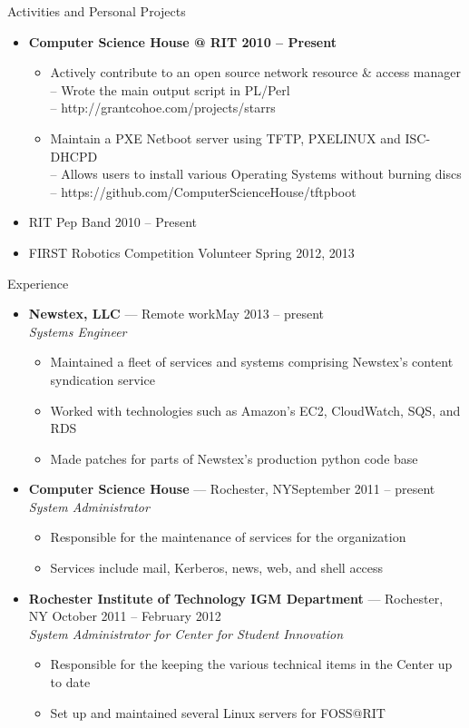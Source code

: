 \documentclass[10pt,oneside]{article}
\newenvironment{ressection}[1]{
	\vspace{3pt}
	{\fontfamily{ppl}\selectfont\Large#1}
	\begin{itemize}
	\vspace{2pt}
}{
	\end{itemize}
}
\newcommand{\resitem}[1]{
	\vspace{-2pt}
	\item \begin{flushleft} #1 \end{flushleft}
}
\newcommand{\ressubitem}[1]{
	\vspace{-1pt}
	\item \begin{flushleft} #1 \end{flushleft}
}
\newcommand{\resbigitem}[3]{
	\vspace{-3pt}
	\item
	\textbf{#1} --- #2 \\
	\textit{#3}
}
\newenvironment{ressubsec}[3]{
	\resbigitem{#1}{#2}{#3}
	\vspace{-1pt}
	\begin{itemize}
}{
	\end{itemize}
}
\newenvironment{reslist}[1]{
	\resitem{\textbf{#1}}
	\vspace{-3pt}
	\begin{itemize}
}{
	\end{itemize}
}
\begin{document}
\begin{ressection}{Activities and Personal Projects}
	\begin{reslist}{Computer Science House @ RIT \hfill 2010 -- Present}
		\ressubitem{Actively contribute to an open source network resource \& access manager \\
			\hspace{8pt} -- Wrote the main output script in PL/Perl \\ 
			\hspace{8pt} -- http://grantcohoe.com/projects/starrs}
		\ressubitem{Maintain a PXE Netboot server using TFTP, PXELINUX and ISC-DHCPD \\
			\hspace{8pt} -- Allows users to install various Operating Systems without burning discs \\
			\hspace{8pt} -- https://github.com/ComputerScienceHouse/tftpboot}
	\end{reslist}
	\resitem{RIT Pep Band \hfill 2010 -- Present}
	\resitem{FIRST Robotics Competition Volunteer \hfill Spring 2012, 2013}
\end{ressection}


\begin{ressection}{Experience}

	\begin{ressubsec}{Newstex, LLC}{Remote work\hfill May 2013 -- present}{Systems Engineer}
		\ressubitem{Maintained a fleet of services and systems comprising Newstex's content syndication service}
		\ressubitem{Worked with technologies such as Amazon's EC2, CloudWatch, SQS, and RDS}
		\ressubitem{Made patches for parts of Newstex's production python code base}
	\end{ressubsec}
	\begin{ressubsec}{Computer Science House}{Rochester, NY\hfill September 2011 -- present}{System Administrator}
		\ressubitem{Responsible for the maintenance of services for the organization}
		\ressubitem{Services include mail, Kerberos, news, web, and shell access}
	\end{ressubsec}
	\begin{ressubsec}{Rochester Institute of Technology IGM Department}{Rochester, NY \hfill October 2011 -- February 2012}{System Administrator for Center for Student Innovation}
		\ressubitem{Responsible for the keeping the various technical items in the Center up to date}
		\ressubitem{Set up and maintained several Linux servers for FOSS@RIT}
	\end{ressubsec}

\end{ressection}
\end{document}
